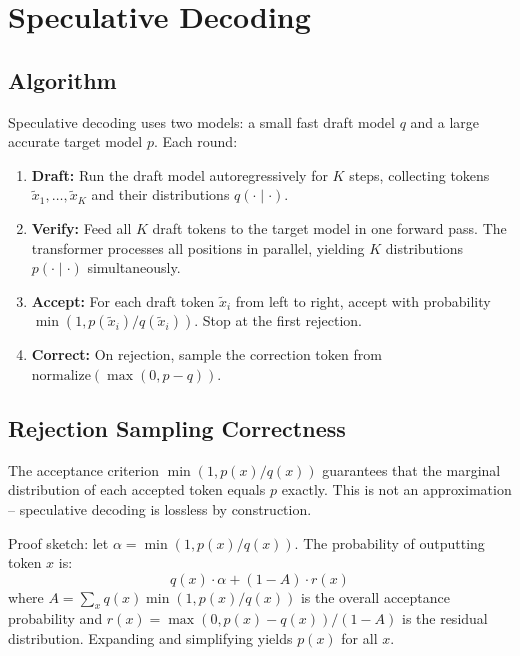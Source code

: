 \documentclass[12pt, a4paper]{article}
\begin{document}
\section{Speculative Decoding}

\subsection{Algorithm}

Speculative decoding \cite{leviathan2023} uses two models: a small fast draft model
$q$ and a large accurate target model $p$. Each round:

\begin{enumerate}
    \item \textbf{Draft:} Run the draft model autoregressively for $K$ steps,
          collecting tokens $\tilde{x}_1, \ldots, \tilde{x}_K$ and their
          distributions $q(\cdot \mid \cdot)$.
    \item \textbf{Verify:} Feed all $K$ draft tokens to the target model in one
          forward pass. The transformer processes all positions in parallel,
          yielding $K$ distributions $p(\cdot \mid \cdot)$ simultaneously.
    \item \textbf{Accept:} For each draft token $\tilde{x}_i$ from left to right,
          accept with probability $\min(1, p(\tilde{x}_i) / q(\tilde{x}_i))$.
          Stop at the first rejection.
    \item \textbf{Correct:} On rejection, sample the correction token from
          $\text{normalize}(\max(0, p - q))$.
\end{enumerate}

\subsection{Rejection Sampling Correctness}

The acceptance criterion $\min(1, p(x)/q(x))$ guarantees that the marginal
distribution of each accepted token equals $p$ exactly. This is not an
approximation -- speculative decoding is lossless by construction.

Proof sketch: let $\alpha = \min(1, p(x)/q(x))$. The probability of outputting
token $x$ is:
\[
    q(x) \cdot \alpha + (1 - A) \cdot r(x)
\]
where $A = \sum_x q(x) \min(1, p(x)/q(x))$ is the overall acceptance probability
and $r(x) = \max(0, p(x) - q(x)) / (1 - A)$ is the residual distribution.
Expanding and simplifying yields $p(x)$ for all $x$.
\end{document}
